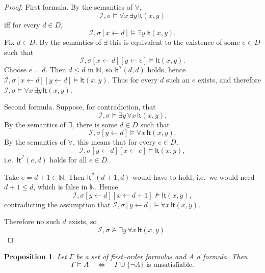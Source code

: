 \documentclass{article}
\theoremstyle{plain}
\newtheorem{proposition}{Proposition}
\theoremstyle{definition}
\theoremstyle{remark}
\begin{document}
\begin{proof}
First formula. By the semantics of $\forall$,
\[
\mathcal I,\sigma \vDash \forall x\,\exists y\,\mathsf{lt}(x,y)
\]
iff for every $d\in D$,
\[
\mathcal I,\sigma[x\leftarrow d] \vDash \exists y\,\mathsf{lt}(x,y).
\]
Fix $d\in D$. By the semantics of $\exists$ this is equivalent to the existence
of some $e\in D$ such that
\[
\mathcal I,\sigma[x\leftarrow d][y\leftarrow e] \vDash \mathsf{lt}(x,y).
\]
Choose $e=d$. Then $d\le d$ in $\mathbb N$, so
$\mathsf{lt}^{\mathcal I}(d,d)$ holds, hence
\(\mathcal I,\sigma[x\leftarrow d][y\leftarrow d]\vDash \mathsf{lt}(x,y)\).
Thus for every $d$ such an $e$ exists, and therefore
\(\mathcal I,\sigma \vDash \forall x\,\exists y\,\mathsf{lt}(x,y)\).

\medskip
Second formula. Suppose, for contradiction, that
\[
\mathcal I,\sigma \vDash \exists y\,\forall x\,\mathsf{lt}(x,y).
\]
By the semantics of $\exists$, there is some $d\in D$ such that
\[
\mathcal I,\sigma[y\leftarrow d] \vDash \forall x\,\mathsf{lt}(x,y).
\]
By the semantics of $\forall$, this means that for every $e\in D$,
\[
\mathcal I,\sigma[y\leftarrow d][x\leftarrow e] \vDash \mathsf{lt}(x,y),
\]
i.e.\ $\mathsf{lt}^{\mathcal I}(e,d)$ holds for all $e\in D$.

Take $e=d+1\in\mathbb N$. Then $\mathsf{lt}^{\mathcal I}(d+1,d)$ would have
to hold, i.e.\ we would need $d+1\le d$, which is false in $\mathbb N$.
Hence
\[
\mathcal I,\sigma[y\leftarrow d][x\leftarrow d+1] \nvDash \mathsf{lt}(x,y),
\]
contradicting the assumption that
$\mathcal I,\sigma[y\leftarrow d] \vDash \forall x\,\mathsf{lt}(x,y)$.

Therefore no such $d$ exists, so
\[
\mathcal I,\sigma \nvDash \exists y\,\forall x\,\mathsf{lt}(x,y).
\]
\end{proof}

\begin{proposition}
Let $\Gamma$ be a set of first--order formulas and $A$ a formula.
Then
\[
\Gamma \vDash A \quad\Longleftrightarrow\quad
\Gamma \cup \{\neg A\} \text{ is unsatisfiable}.
\]
\end{proposition}
\end{document}
